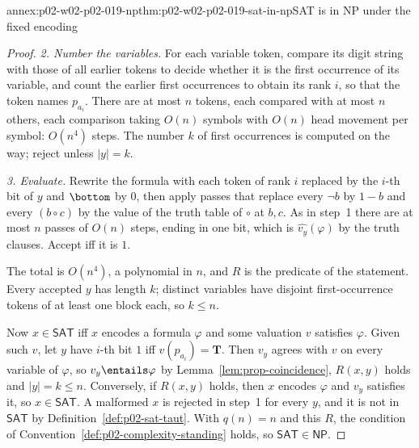 \begin{annexitem}{annex:p02-w02-p02-019-np}{thm:p02-w02-p02-019-sat-in-np}{SAT is in NP under the fixed encoding}
\begin{proof}
\emph{2.  Number the variables.}  For each variable token, compare its digit
string with those of all earlier tokens to decide whether it is the first
occurrence of its variable, and count the earlier first occurrences to obtain
its rank \(i\), so that the token names \(p_{a_i}\).  There are at most \(n\)
tokens, each compared with at most \(n\) others, each comparison taking
\(O(n)\) symbols with \(O(n)\) head movement per symbol: \(O(n^4)\) steps.  The
number \(k\) of first occurrences is computed on the way; reject unless
\(|y|=k\).

\emph{3.  Evaluate.}  Rewrite the formula with each token of rank \(i\)
replaced by the \(i\)-th bit of \(y\) and \(\bottom\) by \(0\), then apply
passes that replace every \(\neg b\) by \(1-b\) and every \((b\circ c)\) by the
value of the truth table of \(\circ\) at \(b,c\).  As in step~1 there are at
most \(n\) passes of \(O(n)\) steps, ending in one bit, which is
\(\widehat{v_y}(\varphi)\) by the truth clauses.  Accept iff it is \(1\).

The total is \(O(n^4)\), a polynomial in \(n\), and \(R\) is the predicate of
the statement.  Every accepted \(y\) has length \(k\); distinct variables
have disjoint first-occurrence tokens of at least one block each, so
\(k\leq n\).

Now \(x\in\mathsf{SAT}\) iff \(x\) encodes a formula \(\varphi\) and some
valuation \(v\) satisfies \(\varphi\).  Given such \(v\), let \(y\) have
\(i\)-th bit \(1\) iff \(v(p_{a_i})=\mathbf{T}\).  Then \(v_y\) agrees with \(v\) on
every variable of \(\varphi\), so \(v_y\entails\varphi\) by
Lemma~\ref{lem:prop-coincidence}, \(R(x,y)\) holds and \(|y|=k\leq n\).
Conversely, if \(R(x,y)\) holds, then \(x\) encodes \(\varphi\) and \(v_y\)
satisfies it, so \(x\in\mathsf{SAT}\).  A malformed \(x\) is rejected in
step~1 for every \(y\), and it is not in \(\mathsf{SAT}\) by
Definition~\ref{def:p02-sat-taut}.  With \(q(n)=n\) and this \(R\), the
condition of Convention~\ref{def:p02-complexity-standing} holds, so
\(\mathsf{SAT}\in\mathsf{NP}\).
\end{proof}
\end{annexitem}

